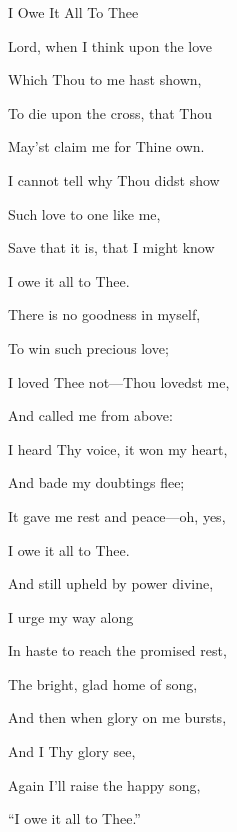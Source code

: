 \documentclass[12pt]{book}
\begin{document}
\begin{song}{I Owe It All To Thee}{}
  {\SBPubDom}
  {}
  {}
  {}

  \begin{SBVerse}
    Lord, when I think upon the love

    Which Thou to me hast shown,

    To die upon the cross, that Thou

    May'st claim me for Thine own.

    I cannot tell why Thou didst show

    Such love to one like me,

    Save that it is, that I might know

    I owe it all to Thee.
  \end{SBVerse}

  \begin{SBVerse}
    There is no goodness in myself,

    To win such precious love;

    I loved Thee not---Thou lovedst me,

    And called me from above:

    I heard Thy voice, it won my heart,

    And bade my doubtings flee;

    It gave me rest and peace---oh, yes,

    I owe it all to Thee.
  \end{SBVerse}

  \begin{SBVerse}
    And still upheld by power divine,

    I urge my way along

    In haste to reach the promised rest,

    The bright, glad home of song,

    And then when glory on me bursts,

    And I Thy glory see,

    Again I'll raise the happy song,

    ``I owe it all to Thee.''
  \end{SBVerse}
\end{song}
\end{document}

